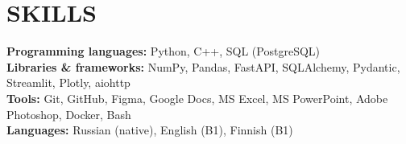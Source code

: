 \documentclass[letterpaper,11pt]{article}
\begin{document}
\section{SKILLS}
 \begin{itemize}[leftmargin=0in, label={}]
    \small{\item{
      \textbf{Programming languages:} {Python, C++, SQL (PostgreSQL)}\vspace{2pt} \\
      \textbf{Libraries \& frameworks:} {NumPy, Pandas, FastAPI, SQLAlchemy, Pydantic, Streamlit, Plotly, aiohttp}\vspace{2pt} \\
      \textbf{Tools:} {Git, GitHub, Figma, Google Docs, MS Excel, MS PowerPoint, Adobe Photoshop, Docker, Bash}\vspace{2pt} \\
      \textbf{Languages:} {Russian (native), English (B1), Finnish (B1)}
    }}
   \end{itemize}
\end{document}
